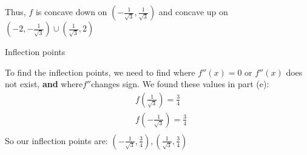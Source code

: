 \documentclass[handout,nooutcomes]{ximera}
\renewenvironment{freeResponse}{
\ifhandout\setbox0\vbox\bgroup\else
\begin{trivlist}\item[\hskip \labelsep\bfseries Solution:\hspace{2ex}]
\fi}
{\ifhandout\egroup\else
\end{trivlist}
\fi}
\newcommand{\dfn}{\textbf}
\begin{document}
\begin{problem}
\begin{enumerate}
\begin{freeResponse}
		
\begin{center}
\begin{image}
\end{image}
\end{center}


		
		
		Thus, $f$ is concave down on $\left( - \frac{1}{\sqrt{3}}, \frac{1}{\sqrt{3}} \right)$ and concave up on \\ 
		$\left( -2, - \frac{1}{\sqrt{3}} \right) \cup \left( \frac{1}{\sqrt{3}}, 2 \right)$
		\end{freeResponse}
		
	\item  Inflection points
	
		\begin{freeResponse}
		To find the inflection points, we need to find where $f''(x)=0$ or $f''(x)$ does not exist, \dfn{and} where$f''$changes sign.  We found these values in part (e):
		\begin{align*}
 		 & f\left( \frac{1}{\sqrt{3}} \right)=\frac{3}{4} \\ 
 		& f\left( -\frac{1}{\sqrt{3}} \right)=\frac{3}{4} \\ 
		\end{align*}  
		So our inflection points are: $\left( -\frac{1}{\sqrt{3}},\frac{3}{4} \right),\left( \frac{1}{\sqrt{3}},\frac{3}{4} \right)$
		\end{freeResponse}
		

\end{enumerate}
\end{problem}
\end{document}
